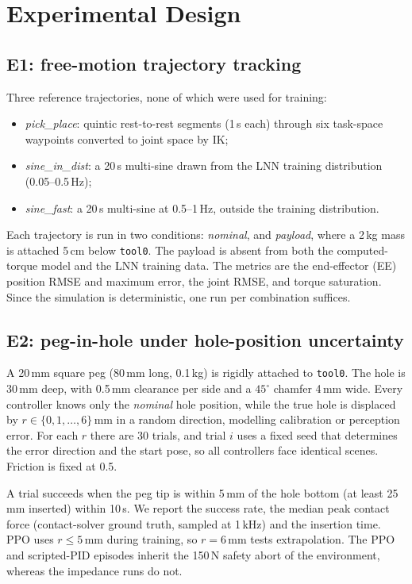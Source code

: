 \documentclass[conference]{IEEEtran}
\newcommand{\todo}[1]{\textcolor{red}{[TODO: #1]}}
\begin{document}
\section{Experimental Design}\label{sec:design}

\subsection{E1: free-motion trajectory tracking}
Three reference trajectories, none of which were used for training:
\begin{itemize}
\item \emph{pick\_place}: quintic rest-to-rest segments (1\,s each) through six task-space waypoints converted to joint space by IK;
\item \emph{sine\_in\_dist}: a 20\,s multi-sine drawn from the LNN training distribution (0.05--0.5\,Hz);
\item \emph{sine\_fast}: a 20\,s multi-sine at 0.5--1\,Hz, outside the training distribution.
\end{itemize}
Each trajectory is run in two conditions: \emph{nominal}, and \emph{payload}, where a 2\,kg mass is attached 5\,cm below \texttt{tool0}. The payload is absent from both the computed-torque model and the LNN training data. The metrics are the end-effector (EE) position RMSE and maximum error, the joint RMSE, and torque saturation. Since the simulation is deterministic, one run per combination suffices.

\subsection{E2: peg-in-hole under hole-position uncertainty}
A 20\,mm square peg (80\,mm long, 0.1\,kg) is rigidly attached to \texttt{tool0}. The hole is 30\,mm deep, with 0.5\,mm clearance per side and a $45^\circ$ chamfer 4\,mm wide. Every controller knows only the \emph{nominal} hole position, while the true hole is displaced by $r\in\{0,1,\dots,6\}$\,mm in a random direction, modelling calibration or perception error. For each $r$ there are 30 trials, and trial $i$ uses a fixed seed that determines the error direction and the start pose, so all controllers face identical scenes. Friction is fixed at 0.5.

A trial succeeds when the peg tip is within 5\,mm of the hole bottom (at least 25\,mm inserted) within 10\,s. We report the success rate, the median peak contact force (contact-solver ground truth, sampled at 1\,kHz) and the insertion time. PPO uses $r\le5$\,mm during training, so $r=6$\,mm tests extrapolation. The PPO and scripted-PID episodes inherit the 150\,N safety abort of the environment, whereas the impedance runs do not.
\end{document}
